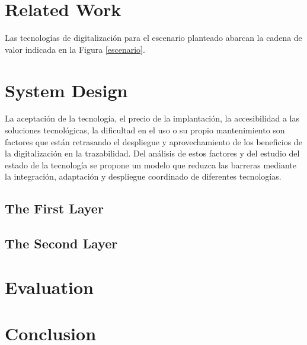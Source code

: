 \section{Related Work}

Las tecnologías de digitalización para el escenario planteado abarcan la cadena de valor indicada en la Figura \ref{escenario}.

\section{System Design}
La aceptación de la tecnología, el precio de la implantación, la accesibilidad a las soluciones tecnológicas, la dificultad en el uso o su propio mantenimiento son factores que están retrasando el despliegue y aprovechamiento de los beneficios de la digitalización en la trazabilidad. Del análisis de estos factores y del estudio del estado de la tecnología se propone un modelo que reduzca las barreras mediante la integración, adaptación y despliegue coordinado de diferentes tecnologías. 

\subsection{The First Layer}
\Blindtext

\subsection{The Second Layer}
\Blindtext

\section{Evaluation}
\Blindtext

\section{Conclusion}
\blindtext


